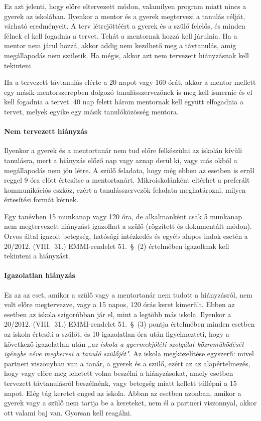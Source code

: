 Ez azt jelenti, hogy előre eltervezett módon, valamilyen program miatt nincs a gyerek az
iskolában. Ilyenkor a mentor és a gyerek megtervezi a tanulás célját,
várható eredményeit. A terv létrejöttéért a gyerek és a szülő felelős,
és minden félnek el kell fogadnia a tervet. Tehát a mentornak hozzá kell
járulnia. Ha a mentor nem járul hozzá, akkor addig nem kezdhető meg a
távtanulás, amig megállapodás nem születik. Ha mégis, akkor azt nem
tervezett hiányzásnak kell tekinteni.

Ha a tervezett távtanulás elérte a 20 napot vagy 160 órát, akkor a
mentor mellett egy másik mentorszerepben dolgozó tanulásszervezőnek is\break
meg kell ismernie és el kell fogadnia a tervet. 40 nap felett három
mentornak kell együtt elfogadnia a tervet, melyek egyike egy másik
tanulóközösség mentora.

\hypertarget{nem-tervezett-hianyzas}{%
\paragraph{Nem tervezett hiányzás}\label{nem-tervezett-hianyzas}}

Ilyenkor a gyerek és a mentortanár nem tud előre felkészülni az iskolán kívüli
tanulásra, mert a hiányzás előző nap vagy aznap derül ki, vagy más okból
a megállapodás nem jön létre. A szülő feladata, hogy még ebben az
esetben is erről reggel 9 óra előtt értesítse a mentortanárt.
Mikroiskolánként eltérhet a preferált kommunikációs eszköz, ezért a
tanulásszervezők feladata meghatározni, milyen értesítési
formát kérnek.

Egy tanévben 15 munkanap vagy 120 óra, de alkalmanként csak 5 munkanap
nem megtervezett hiányzást igazolhat a szülő (rögzített és dokumentált
módon). Orvos által igazolt betegség, hatósági intézkedés és egyéb
alapos indok esetén a 20/2012. (VIII.~31.) EMMI-rendelet 51.~§~(2)
értelmében igazoltnak kell tekinteni a hiányzást.

\hypertarget{igazolatlan-hianyzas}{%
\paragraph{Igazolatlan hiányzás}\label{igazolatlan-hianyzas}}

Ez az az eset, amikor a szülő vagy a mentortanár nem tudott a hiányzásról,
nem volt előre megtervezve, vagy a 15 napos, 120 órás keret kimerült.
Ebben az esetben az iskola szigorúbban jár el, mint a legtöbb más
iskola. Ilyenkor a 20/2012. (VIII.~31.) EMMI-rendelet 51.~§~(3) pontja
értelmében minden esetben az iskola értesíti a szülőt, és 10 igazolatlan
óra után figyelmezteti, hogy a következő igazolatlan után \emph{„az
iskola a gyermekjóléti szolgálat közreműködését igénybe véve megkeresi a
tanuló szülőjét"}. Az iskola megközelítése egyszerű: mivel partneri
viszonyban van a tanár, a gyerek és a szülő, ezért az az alapértelmezés,
hogy vagy előre meg lehetett volna beszélni a hiányzásokat, amely
esetben tervezett távtanulásról beszélnénk, vagy betegség miatt kellett
túllépni a 15 napot. Elég tág keretet enged az iskola. Abban az esetben
azonban, amikor a gyerek vagy a szülő nem tartja be a kereteket, nem él
a partneri viszonnyal, akkor ott valami baj van. Gyorsan kell reagálni.


